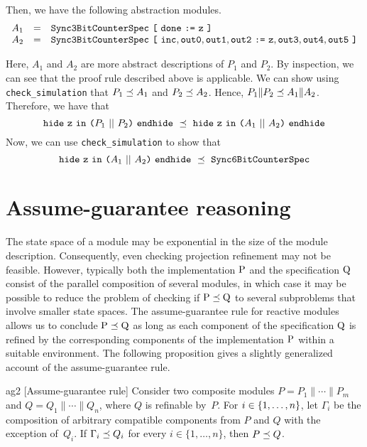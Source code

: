\mypar
Then, we have the following abstraction modules.
\[
\begin{array}{rcl}
A_1 & = & \SCountThreeSpec\ \LSQBRAC\ \done\ \ASSIGN\ {\tt z}\ \RSQBRAC \\
A_2 & = & \SCountThreeSpec\ \LSQBRAC\ \inc, \oouta, \ooutb, \ooutc\ \ASSIGN\ {\tt z}, \ooutd, \ooute, \ooutf\ \RSQBRAC
\end{array}
\]

\mypar
Here, $A_1$ and $A_2$ are more abstract descriptions of $P_1$ and
$P_2$. By inspection, we can see that the proof rule described above
is applicable.
We can show using {\tt check\_simulation} that $P_1 \preceq A_1$ and
$P_2 \preceq A_2$. Hence, $P_1 \| P_2 \preceq A_1
\| A_2$. Therefore, we have that 
\begin{displaymath}
\HIDE\ {\tt z}\ \IN\ \LPARA P_1\ \pppar\ P_2\RPARA\ \ENDHIDE\ \refines\ \HIDE\ {\tt z}\ \IN\ \LPARA A_1\ \pppar\ A_2\RPARA\ \ENDHIDE 
\end{displaymath}
Now, we can use {\tt check\_simulation} to show that 
\begin{displaymath}
\HIDE\ {\tt z}\ \IN\ \LPARA A_1\ \pppar\ A_2\RPARA\ \ENDHIDE\ \refines\ \SCountSixSpec
\end{displaymath}
 

\section{Assume-guarantee reasoning}
\label{sec:assume_guarantee}
The state space of a module may be exponential in the size of the module
description.  Consequently, even checking projection refinement may not be
feasible.  However, typically both the implementation $\mbox{P}$ and the
specification $\mbox{Q}$ consist of the parallel composition of several modules,
in which case it may be possible to reduce the problem of checking if
$\mbox{P}\preceq\mbox{Q}$ to several subproblems that involve smaller state spaces.
The assume-guarantee rule for reactive modules \cite{AlurHenzinger96} allows us to
conclude $\mbox{P}\preceq\mbox{Q}$ as long as each component of the specification
$\mbox{Q}$ is refined by the corresponding components of the implementation $\mbox{P}$
within a suitable environment.  The following proposition gives a slightly 
generalized account of the assume-guarantee rule.
 
\begin {proposition}{ag2} 
 [Assume-guarantee rule]
 Consider two composite modules $P = P_1 \| \cdots \| P_m$ and 
 $Q = Q_1 \| \cdots \| Q_n$, where $Q$ is refinable by~$P$.
 For $i\in\{1,\ldots,n\}$, let $\Gamma_i$ be the composition of 
 arbitrary compatible components from $P$ and $Q$ with the exception 
 of~$Q_i$. 
 If $\Gamma_i \preceq Q_i$  for every $i \in \{ 1, \ldots, n\}$,
 then $P \preceq Q$. 
\end {proposition}

